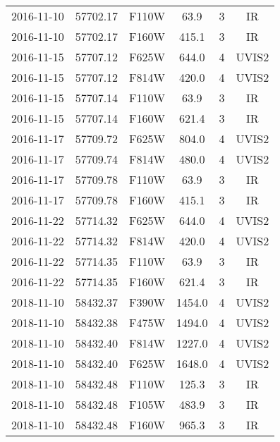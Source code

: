 \begin{tabular}{cccccc}
2016-11-10 & 57702.17 & F110W & 63.9 & 3 & IR \\
2016-11-10 & 57702.17 & F160W & 415.1 & 3 & IR \\
2016-11-15 & 57707.12 & F625W & 644.0 & 4 & UVIS2 \\
2016-11-15 & 57707.12 & F814W & 420.0 & 4 & UVIS2 \\
2016-11-15 & 57707.14 & F110W & 63.9 & 3 & IR \\
2016-11-15 & 57707.14 & F160W & 621.4 & 3 & IR \\
2016-11-17 & 57709.72 & F625W & 804.0 & 4 & UVIS2 \\
2016-11-17 & 57709.74 & F814W & 480.0 & 4 & UVIS2 \\
2016-11-17 & 57709.78 & F110W & 63.9 & 3 & IR \\
2016-11-17 & 57709.78 & F160W & 415.1 & 3 & IR \\
2016-11-22 & 57714.32 & F625W & 644.0 & 4 & UVIS2 \\
2016-11-22 & 57714.32 & F814W & 420.0 & 4 & UVIS2 \\
2016-11-22 & 57714.35 & F110W & 63.9 & 3 & IR \\
2016-11-22 & 57714.35 & F160W & 621.4 & 3 & IR \\
2018-11-10 & 58432.37 & F390W & 1454.0 & 4 & UVIS2 \\
2018-11-10 & 58432.38 & F475W & 1494.0 & 4 & UVIS2 \\
2018-11-10 & 58432.40 & F814W & 1227.0 & 4 & UVIS2 \\
2018-11-10 & 58432.40 & F625W & 1648.0 & 4 & UVIS2 \\
2018-11-10 & 58432.48 & F110W & 125.3 & 3 & IR \\
2018-11-10 & 58432.48 & F105W & 483.9 & 3 & IR \\
2018-11-10 & 58432.48 & F160W & 965.3 & 3 & IR \\
\hline\hline
\end{tabular}
